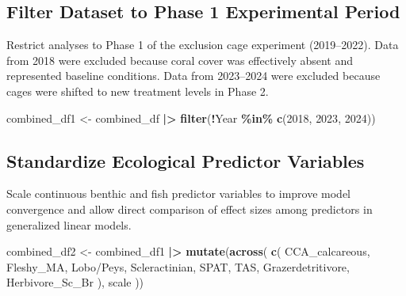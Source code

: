 \documentclass[
]{article}
\newenvironment{Shaded}{\begin{snugshade}}{\end{snugshade}}
\newcommand{\AttributeTok}[1]{\textcolor[rgb]{0.13,0.29,0.53}{#1}}
\newcommand{\DecValTok}[1]{\textcolor[rgb]{0.00,0.00,0.81}{#1}}
\newcommand{\FunctionTok}[1]{\textcolor[rgb]{0.13,0.29,0.53}{\textbf{#1}}}
\newcommand{\NormalTok}[1]{#1}
\newcommand{\OtherTok}[1]{\textcolor[rgb]{0.56,0.35,0.01}{#1}}
\newcommand{\SpecialCharTok}[1]{\textcolor[rgb]{0.81,0.36,0.00}{\textbf{#1}}}
\newcommand{\StringTok}[1]{\textcolor[rgb]{0.31,0.60,0.02}{#1}}
\begin{document}
\subsection{Filter Dataset to Phase 1 Experimental
Period}\label{filter-dataset-to-phase-1-experimental-period}

Restrict analyses to Phase 1 of the exclusion cage experiment
(2019--2022). Data from 2018 were excluded because coral cover was
effectively absent and represented baseline conditions. Data from
2023--2024 were excluded because cages were shifted to new treatment
levels in Phase 2.

\begin{Shaded}
\begin{Highlighting}[]
\NormalTok{combined\_df1 }\OtherTok{\textless{}{-}}\NormalTok{ combined\_df }\SpecialCharTok{|\textgreater{}} 
  \FunctionTok{filter}\NormalTok{(}\SpecialCharTok{!}\NormalTok{Year }\SpecialCharTok{\%in\%} \FunctionTok{c}\NormalTok{(}\DecValTok{2018}\NormalTok{, }\DecValTok{2023}\NormalTok{, }\DecValTok{2024}\NormalTok{))}
\end{Highlighting}
\end{Shaded}

\subsection{Standardize Ecological Predictor
Variables}\label{standardize-ecological-predictor-variables}

Scale continuous benthic and fish predictor variables to improve model
convergence and allow direct comparison of effect sizes among predictors
in generalized linear models.

\begin{Shaded}
\begin{Highlighting}[]
\NormalTok{combined\_df2 }\OtherTok{\textless{}{-}}\NormalTok{ combined\_df1 }\SpecialCharTok{|\textgreater{}} 
  \FunctionTok{mutate}\NormalTok{(}\FunctionTok{across}\NormalTok{(}
    \FunctionTok{c}\NormalTok{(}
\NormalTok{      CCA\_calcareous,}
\NormalTok{      Fleshy\_MA,}
      \StringTok{\textasciigrave{}}\AttributeTok{Lobo/Peys}\StringTok{\textasciigrave{}}\NormalTok{,}
\NormalTok{      Scleractinian,}
\NormalTok{      SPAT,}
\NormalTok{      TAS,}
\NormalTok{      Grazerdetritivore,}
\NormalTok{      Herbivore\_Sc\_Br}
\NormalTok{    ),}
\NormalTok{    scale}
\NormalTok{  ))}
\end{Highlighting}
\end{Shaded}
\end{document}
